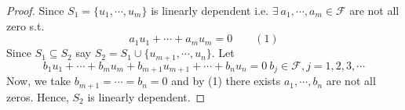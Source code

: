 \begin{proof}
	Since $S_1 = \{u_1 , \cdots,u_m\}$ is linearly dependent i.e. $\exists\ a_1,\cdots,a_m \in \mathcal{F}$ are not all zero s.t. $$ a_1u_1+\cdots + a_mu_m = 0 \quad \quad(1)$$ Since $S_1 \subseteq S_2$ say $S_2 = S_1 \cup \{u_{m+1},\cdots,u_n\}$. Let $$b_1u_1 + \cdots+b_mu_m+b_{m+1}u_{m+1}+\cdots + b_{n}u_n = 0\ b_j\in\mathcal{F} ,  j= 1,2,3,\cdots $$ Now, we take $b_{m+1}=\cdots = b_{n}=0$ and by (1) there exists $a_1,\cdots,b_{n}$ are not all zeros. Hence, $S_2$ is linearly dependent.  
\end{proof}

